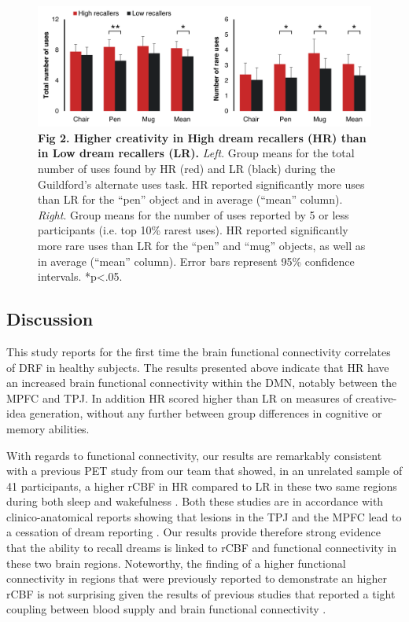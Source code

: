 \begin{figure}[!htbp]
	\includegraphics[width=\textwidth]{Fig/Results/Inertia/Creativity/Fig2.png}
	\caption*{\textbf{Fig 2. Higher creativity in High dream recallers (HR) than in Low dream recallers (LR).} \emph{Left}. Group means for the total number of uses found by HR (red) and LR (black) during the Guildford’s alternate uses task. HR reported significantly more uses than LR for the “pen” object and in average (“mean” column). \emph{Right}. Group means for the number of uses reported by 5 or less participants (i.e. top 10\% rarest uses). HR reported significantly more rare uses than LR for the “pen” and “mug” objects, as well as in average (“mean” column). Error bars represent 95\% confidence intervals. *p<.05.}
\end{figure}


\subsection*{Discussion}
\label{res:inertia:creativity:discussion}

This study reports for the first time the brain functional connectivity correlates of DRF in healthy subjects. The results presented above indicate that HR have an increased brain functional connectivity within the DMN, notably between the MPFC and TPJ. In addition HR scored higher than LR on measures of creative-idea generation, without any further between group differences in cognitive or memory abilities.

With regards to functional connectivity, our results are remarkably consistent with a previous PET study from our team that showed, in an unrelated sample of 41 participants, a higher rCBF in HR compared to LR in these two same regions during both sleep and wakefulness \citep{eichenlaub_resting_2014}. Both these studies are in accordance with clinico-anatomical reports showing that lesions in the TPJ and the MPFC lead to a cessation of dream reporting \citep{solms_neuropsychology_1997}. Our results provide therefore strong evidence that the ability to recall dreams is linked to rCBF and functional connectivity in these two brain regions. Noteworthy, the finding of a higher functional connectivity in regions that were previously reported to demonstrate an higher rCBF is not surprising given the results of previous studies that reported a tight coupling between blood supply and brain functional connectivity \citep{liang_coupling_2013}.

